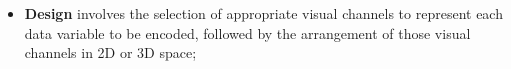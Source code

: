 \begin{itemize}
\item \textbf{Design} involves the selection of appropriate visual channels to represent each data variable to be encoded, followed by the arrangement of those visual channels in 2D or 3D space;

\end{itemize}
